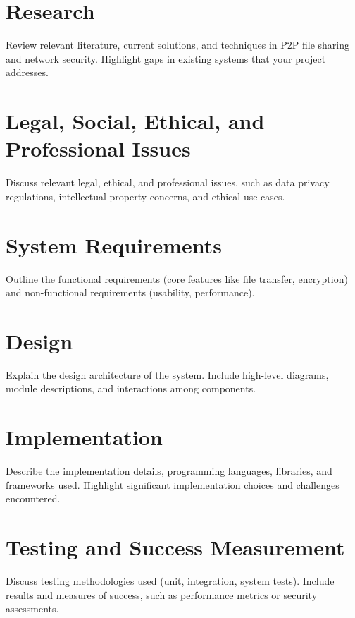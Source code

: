 \documentclass[12pt,a4paper]{report}
\begin{document}
\chapter{Research}
    Review relevant literature, current solutions, and techniques in P2P file sharing and network security. Highlight gaps in existing systems that your project addresses.

\chapter{Legal, Social, Ethical, and Professional Issues}
    Discuss relevant legal, ethical, and professional issues, such as data privacy regulations, intellectual property concerns, and ethical use cases.


\chapter{System Requirements}
    Outline the functional requirements (core features like file transfer, encryption) and non-functional requirements (usability, performance).

\chapter{Design}
    Explain the design architecture of the system. Include high-level diagrams, module descriptions, and interactions among components.

\chapter{Implementation}
    Describe the implementation details, programming languages, libraries, and frameworks used. Highlight significant implementation choices and challenges encountered.

\chapter{Testing and Success Measurement}
    Discuss testing methodologies used (unit, integration, system tests). Include results and measures of success, such as performance metrics or security assessments.
\end{document}

